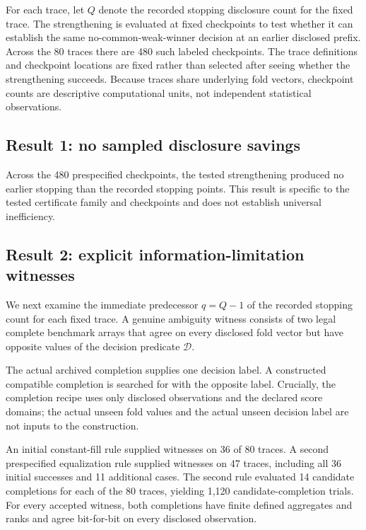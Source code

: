 \documentclass[preprint,11pt]{elsarticle}
\begin{document}
For each trace, let $Q$ denote the recorded stopping disclosure count for the fixed trace. The strengthening is evaluated at fixed checkpoints to test whether it can establish the same no-common-weak-winner decision at an earlier disclosed prefix. Across the 80 traces there are 480 such labeled checkpoints. The trace definitions and checkpoint locations are fixed rather than selected after seeing whether the strengthening succeeds. Because traces share underlying fold vectors, checkpoint counts are descriptive computational units, not independent statistical observations.

\subsection{Result 1: no sampled disclosure savings}

Across the 480 prespecified checkpoints, the tested strengthening produced no earlier stopping than the recorded stopping points. This result is specific to the tested certificate family and checkpoints and does not establish universal inefficiency.

\subsection{Result 2: explicit information-limitation witnesses}

We next examine the immediate predecessor $q=Q-1$ of the recorded stopping count for each fixed trace. A genuine ambiguity witness consists of two legal complete benchmark arrays that agree on every disclosed fold vector but have opposite values of the decision predicate $\mathcal D$.

The actual archived completion supplies one decision label. A constructed compatible completion is searched for with the opposite label. Crucially, the completion recipe uses only disclosed observations and the declared score domains; the actual unseen fold values and the actual unseen decision label are not inputs to the construction.

An initial constant-fill rule supplied witnesses on 36 of 80 traces. A second prespecified equalization rule supplied witnesses on 47 traces, including all 36 initial successes and 11 additional cases. The second rule evaluated 14 candidate completions for each of the 80 traces, yielding 1,120 candidate-completion trials. For every accepted witness, both completions have finite defined aggregates and ranks and agree bit-for-bit on every disclosed observation.
\end{document}
